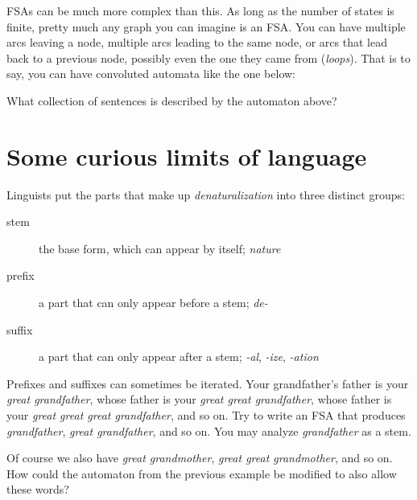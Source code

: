 FSAs can be much more complex than this.
As long as the number of states is finite, pretty much any graph you can imagine is an FSA\@.
You can have multiple arcs leaving a node, multiple arcs leading to the same node, or arcs that lead back to a previous node, possibly even the one they came from (\emph{loops}).
That is to say, you can have convoluted automata like the one below:
%
\begin{center}
\end{center}

\medskip
\begin{homework}
    What collection of sentences is described by the automaton above?
\end{homework}

\section{Some curious limits of language}

Linguists put the parts that make up \emph{denaturalization} into three distinct groups:
%
\begin{description}
    \item[stem] the base form, which can appear by itself; \emph{nature}
    \item[prefix] a part that can only appear before a stem; \emph{de-}
    \item[suffix] a part that can only appear after a stem; \emph{-al}, \emph{-ize}, \emph{-ation}
\end{description}
%
\begin{homework}
    Prefixes and suffixes can sometimes be iterated.
    Your grandfather's father is your \emph{great grandfather}, whose father is your \emph{great great grandfather}, whose father is your \emph{great great great grandfather}, and so on.
    Try to write an FSA that produces \emph{grandfather}, \emph{great grandfather}, and so on.
    You may analyze \emph{grandfather} as a stem.
\end{homework}
%
\begin{homework}
    Of course we also have \emph{great grandmother}, \emph{great great grandmother}, and so on.
    How could the automaton from the previous example be modified to also allow these words?
\end{homework}

